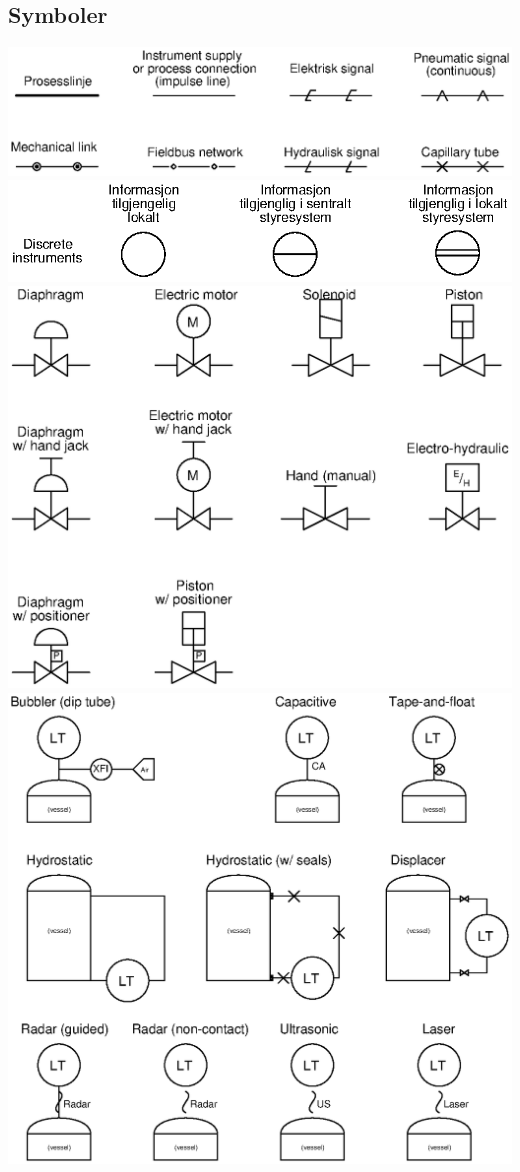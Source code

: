 \subsection{Symboler}
\includegraphics[width=1\textwidth]{diagrams00.eps}
\includegraphics[width=1\textwidth]{diagrams01.eps}
\includegraphics[width=1\textwidth]{diagrams03.eps}
\includegraphics[width=1\textwidth]{diagrams13.eps}
